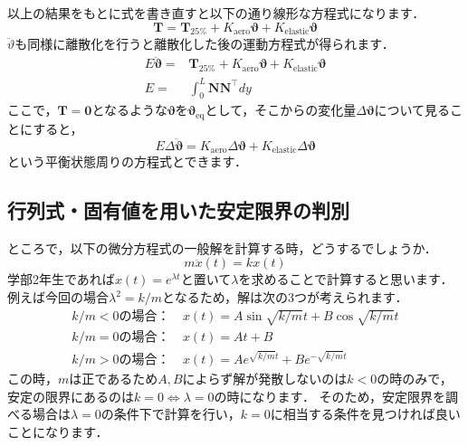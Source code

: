 \documentclass{jarticle}
\begin{document}
以上の結果をもとに式を書き直すと以下の通り線形な方程式になります．
\begin{equation}
    \bm{T} = \bm{T}_\mathrm{25\%} + K_\mathrm{aero} \bm{\vartheta} + K_\mathrm{elastic} \bm{\vartheta}
\end{equation}
$\ddot{\vartheta}$も同様に離散化を行うと離散化した後の運動方程式が得られます．
\begin{align}
    E\ddot{\bm{\vartheta}} =& \bm{T}_\mathrm{25\%} + K_\mathrm{aero} \bm{\vartheta} + K_\mathrm{elastic} \bm{\vartheta} \\
    E =& \int_0^L \bm{N}\bm{N}^\top dy
\end{align}
ここで，$\bm{T}=\bm{0}$となるような$\bm{\vartheta}$を$\bm{\vartheta}_\mathrm{eq}$として，そこからの変化量$\Delta \bm{\vartheta}$について見ることにすると， 
\begin{equation}
    E\Delta\ddot{\bm{\vartheta}} = K_\mathrm{aero} \Delta\bm{\vartheta} + K_\mathrm{elastic} \Delta\bm{\vartheta}
\end{equation}
という平衡状態周りの方程式とできます．

\subsection{行列式・固有値を用いた安定限界の判別}
ところで，以下の微分方程式の一般解を計算する時，どうするでしょうか．
\begin{equation}
    m\ddot{x}(t) = kx(t)
\end{equation}
学部2年生であれば$x(t) = e^{\lambda t}$と置いて$\lambda$を求めることで計算すると思います．
例えば今回の場合$\lambda^2 = k/m$となるため，解は次の3つが考えられます．
\begin{align*}
    k/m < 0の場合：& \ x(t) = A\sin\sqrt{k/m}t + B\cos\sqrt{k/m}t \\
    k/m = 0の場合：& \ x(t) = At + B \\
    k/m > 0の場合：& \ x(t) = Ae^{\sqrt{k/m}t} + Be^{-\sqrt{k/m}t}
\end{align*}
この時，$m$は正であるため$A,B$によらず解が発散しないのは$k < 0$の時のみで，安定の限界にあるのは$k=0 \Leftrightarrow \lambda = 0$の時になります．
そのため，安定限界を調べる場合は$\lambda=0$の条件下で計算を行い，$k=0$に相当する条件を見つければ良いことになります．
\end{document}
